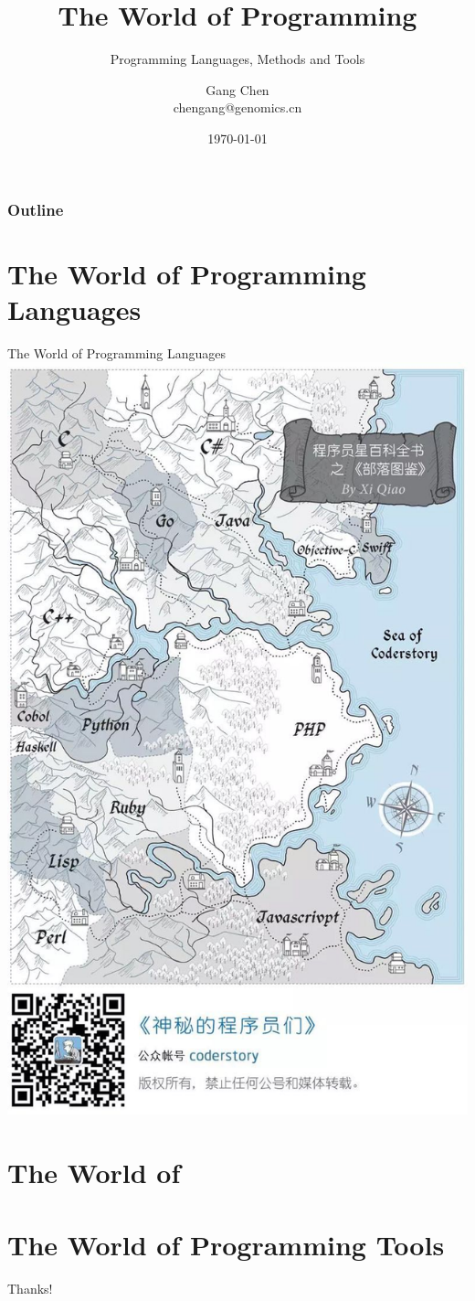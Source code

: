\documentclass[UTF8]{beamer}
\title{The World of Programming}
\subtitle{Programming Languages, Methods and Tools}
\author{Gang Chen\\ chengang@genomics.cn}
\date{\today}
\begin{document}
\begin{frame}
\titlepage
\end{frame}

\begin{frame}[t]\frametitle{Outline}
\tableofcontents[hideallsubsections]
\end{frame}


\section{The World of Programming Languages}

\begin{frame}[t]{The World of Programming Languages}
    \includegraphics{langworld.jpg}
\end{frame}

\section{The World of }

\section{The World of Programming Tools}

\begin{frame}
  \centerline{\Huge{Thanks!}}
\end{frame}
\end{document}
